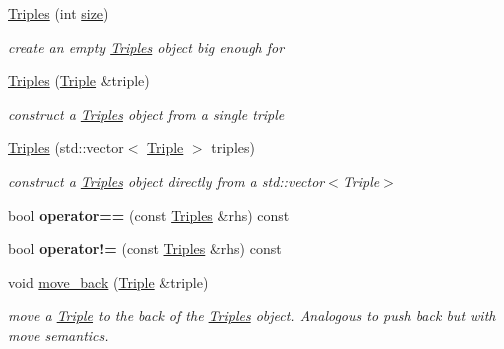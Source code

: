 \begin{DoxyCompactItemize}
\item 
\hyperlink{classomexmeta_1_1Triples_a32ea34c1fd3bfe9887c2221377392efe}{Triples} (int \hyperlink{classomexmeta_1_1Triples_adc86427b3563d04849336a8da7566451}{size})
\begin{DoxyCompactList}\small\item\em create an empty \hyperlink{classomexmeta_1_1Triples}{Triples} object big enough for \end{DoxyCompactList}\item 
\hyperlink{classomexmeta_1_1Triples_a733eea0f6a2c206eb96771bc7a8cb430}{Triples} (\hyperlink{classomexmeta_1_1Triple}{Triple} \&triple)
\begin{DoxyCompactList}\small\item\em construct a \hyperlink{classomexmeta_1_1Triples}{Triples} object from a single triple \end{DoxyCompactList}\item 
\mbox{\label{classomexmeta_1_1Triples_a71a3ff7b185a5420eabd9bf4e9637196}} 
\hyperlink{classomexmeta_1_1Triples_a71a3ff7b185a5420eabd9bf4e9637196}{Triples} (std\+::vector$<$ \hyperlink{classomexmeta_1_1Triple}{Triple} $>$ triples)
\begin{DoxyCompactList}\small\item\em construct a \hyperlink{classomexmeta_1_1Triples}{Triples} object directly from a std\+::vector$<$\+Triple$>$ \end{DoxyCompactList}\item 
\mbox{\label{classomexmeta_1_1Triples_a8c6e00fe9e694d9c52e1fa37a82ae489}} 
bool {\bfseries operator==} (const \hyperlink{classomexmeta_1_1Triples}{Triples} \&rhs) const
\item 
\mbox{\label{classomexmeta_1_1Triples_a8c9df0d37572179d682127cb7368dd82}} 
bool {\bfseries operator!=} (const \hyperlink{classomexmeta_1_1Triples}{Triples} \&rhs) const
\item 
void \hyperlink{classomexmeta_1_1Triples_a88dcf4b950f105acb621bd07f07a38a0}{move\+\_\+back} (\hyperlink{classomexmeta_1_1Triple}{Triple} \&triple)
\begin{DoxyCompactList}\small\item\em move a \hyperlink{classomexmeta_1_1Triple}{Triple} to the back of the \hyperlink{classomexmeta_1_1Triples}{Triples} object. Analogous to push back but with move semantics. \end{DoxyCompactList}\item 

\end{DoxyCompactItemize}
